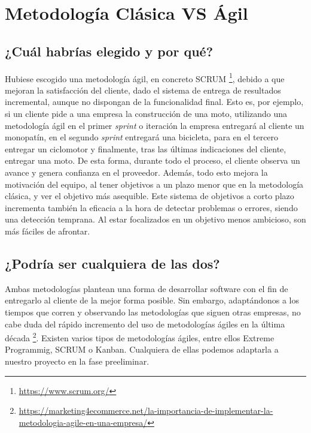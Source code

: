 \documentclass{article}
\begin{document}
\section{Metodología Clásica VS Ágil}

\subsection{¿Cuál habrías elegido y por qué?}

Hubiese escogido una metodología ágil, en concreto SCRUM \footnote{\url{https://www.scrum.org/}}, debido a que mejoran la satisfacción del cliente, dado el sistema de entrega de resultados incremental, aunque no dispongan de la funcionalidad final. Esto es, por ejemplo, si un cliente pide a una empresa la construcción de una moto, utilizando una metodología ágil en el primer \textit{sprint} o iteración la empresa entregará al cliente un monopatín, en el segundo \textit{sprint} entregará una bicicleta, para en el tercero entregar un ciclomotor y finalmente, tras las últimas indicaciones del cliente, entregar una moto. De esta forma, durante todo el proceso, el cliente observa un avance y genera confianza en el proveedor. Además, todo esto mejora la motivación del equipo, al tener objetivos a un plazo menor que en la metodología clásica, y ver el objetivo más asequible. Este sistema de objetivos a corto plazo incrementa también la eficacia a la hora de detectar problemas o errores, siendo una detección temprana. Al estar focalizados en un objetivo menos ambicioso, son más fáciles de afrontar.


\subsection{¿Podría ser cualquiera de las dos?}

Ambas metodologías plantean una forma de desarrollar software con el fin de entregarlo al cliente de la mejor forma posible. Sin embargo, adaptándonos a los tiempos que corren y observando las metodologías que siguen otras empresas, no cabe duda del rápido incremento del uso de metodologías ágiles en la última década \footnote{\url{https://marketing4ecommerce.net/la-importancia-de-implementar-la-metodologia-agile-en-una-empresa/}}. Existen varios tipos de metodologías ágiles, entre ellos Extreme Programmig, SCRUM o Kanban. Cualquiera de ellas podemos adaptarla a nuestro proyecto en la fase preeliminar. 
\end{document}
